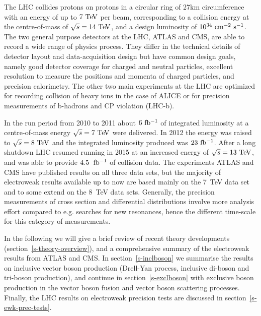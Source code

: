 The LHC collides protons on protons in a circular ring of 27\;km
circumference with an energy of up to $7\TeV$ per beam, corresponding
to a collision energy at the centre-of-mass of $\rts=14\TeV$, and a
design luminosity of $10^{34}\cm^{-2}\s^{-1}$.
The two general purpose detectors at the LHC, ATLAS and CMS, are able
to record a wide range of physics process. They differ in the
technical details of detector layout and data-acquisition design but
have common design goals, namely good detector coverage for charged
and neutral particles, excellent resolution to measure the positions
and momenta of charged particles, and precision calorimetry. The other
two main experiments at the LHC are optimized for recording collision
of heavy ions in the case of ALICE or for precision measurements of
b-hadrons and CP violation (LHC-b).

In the run period from 2010 to 2011 about $6\mbox{\ fb$^{-1}$}$ of integrated
luminosity at a centre-of-mass energy $\rts=7\TeV$ were delivered. In
2012 the energy was raised to $\rts=8\TeV$ and the integrated
luminosity produced was $23\mbox{\ fb$^{-1}$}$.  After a long shutdown LHC resumed
running in 2015 at an increased energy of $\rts=13\TeV$, and was able
to provide $4.5\;\mbox{\ fb$^{-1}$}$ of collision data.  The experiments ATLAS and
CMS have published results on all three data sets, but the majority of
electroweak results available up to now are based mainly on the 7~TeV
data set and to some extend on the 8~TeV data sets. Generally, the
precision measurements of cross section and differential distributions
involve more analysis effort compared to e.g. searches for new
resonances, hence the different time-scale for this category of
measurements.






In the following we will give a brief review
of recent theory developments (section~\ref{s-theory-overview}), and a
comprehensive summary of the electroweak results from ATLAS and
CMS. In section~\ref{s-inclboson} we summarise the results on
inclusive vector boson production (Drell-Yan process, inclusive
di-boson and tri-boson production), and continue in
section~\ref{s-exclboson} with exclusive boson production in the
vector boson fusion and vector boson scattering processes. Finally,
the LHC results on electroweak precision tests are discussed in
section~\ref{s-ewk-prec-tests}.


